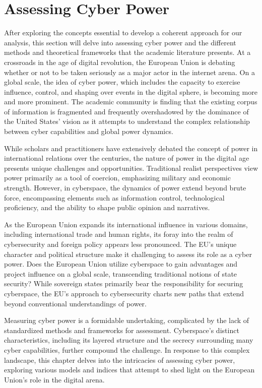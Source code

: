 \chapter{Assessing Cyber Power}

After exploring the concepts essential to develop a coherent approach for our analysis, this section will delve into assessing cyber power and the different methods and theoretical frameworks that the academic literature presents.  At a crossroads in the age of digital revolution, the European Union is debating whether or not to be taken seriously as a major actor in the internet arena. On a global scale, the idea of cyber power, which includes the capacity to exercise influence, control, and shaping over events in the digital sphere, is becoming more and more prominent. The academic community is finding that the existing corpus of information is fragmented and frequently overshadowed by the dominance of the United States' vision as it attempts to understand the complex relationship between cyber capabilities and global power dynamics.

While scholars and practitioners have extensively debated the concept of power in international relations over the centuries, the nature of power in the digital age presents unique challenges and opportunities. Traditional realist perspectives view power primarily as a tool of coercion, emphasizing military and economic strength. However, in cyberspace, the dynamics of power extend beyond brute force, encompassing elements such as information control, technological proficiency, and the ability to shape public opinion and narratives.

As the European Union expands its international influence in various domains, including international trade and human rights, its foray into the realm of cybersecurity and foreign policy appears less pronounced. The EU's unique character and political structure make it challenging to assess its role as a cyber power. Does the European Union utilize cyberspace to gain advantages and project influence on a global scale, transcending traditional notions of state security? While sovereign states primarily bear the responsibility for securing cyberspace, the EU's approach to cybersecurity charts new paths that extend beyond conventional understandings of power.

Measuring cyber power is a formidable undertaking, complicated by the lack of standardized methods and frameworks for assessment. Cyberspace's distinct characteristics, including its layered structure and the secrecy surrounding many cyber capabilities, further compound the challenge. In response to this complex landscape, this chapter delves into the intricacies of assessing cyber power, exploring various models and indices that attempt to shed light on the European Union's role in the digital arena.

